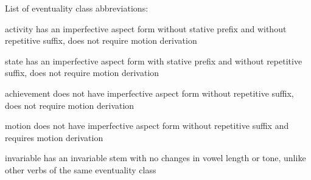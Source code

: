 \vspace{\baselineskip}
\noindent
List of eventuality class abbreviations:
\begin{description}[font={\normalfont}, style=sameline, labelindent=\parindent, labelwidth=3em, leftmargin=!]
\item[act]	activity\newline
		has an imperfective aspect form without stative prefix
		and without repetitive suffix, does not require motion derivation
\item[state]	state\newline
		has an imperfective aspect form with stative prefix
		and without repetitive suffix, does not require motion derivation
\item[ach]	achievement\newline
		does not have imperfective aspect form without repetitive suffix,
		does not require motion derivation
\item[mot]	motion\newline
		does not have imperfective aspect form without repetitive suffix
		and requires motion derivation
\item[inv]	invariable\newline
		has an invariable stem with no changes in vowel length or tone,
		unlike other verbs of the same eventuality class
\end{description}
